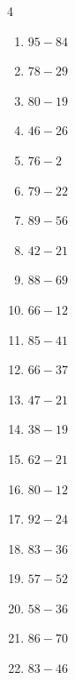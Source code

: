 \begin{multicols}{4}
\begin{enumerate}
  \item $95-84$
        \phantom{$=11$}

  \item $78-29$
        \phantom{$=49$}

  \item $80-19$
        \phantom{$=61$}

  \item $46-26$
        \phantom{$=20$}

  \item $76-2$
        \phantom{$=74$}

  \item $79-22$
        \phantom{$=57$}

  \item $89-56$
        \phantom{$=33$}

  \item $42-21$
        \phantom{$=21$}

  \item $88-69$
        \phantom{$=19$}

  \item $66-12$
        \phantom{$=54$}

  \item $85-41$
        \phantom{$=44$}

  \item $66-37$
        \phantom{$=29$}

  \item $47-21$
        \phantom{$=26$}

  \item $38-19$
        \phantom{$=19$}

  \item $62-21$
        \phantom{$=41$}

  \item $80-12$
        \phantom{$=68$}

  \item $92-24$
        \phantom{$=68$}

  \item $83-36$
        \phantom{$=47$}

  \item $57-52$
        \phantom{$=5$}

  \item $58-36$
        \phantom{$=22$}

  \item $86-70$
        \phantom{$=16$}

  \item $83-46$
        \phantom{$=37$}


\end{enumerate}
\end{multicols}
